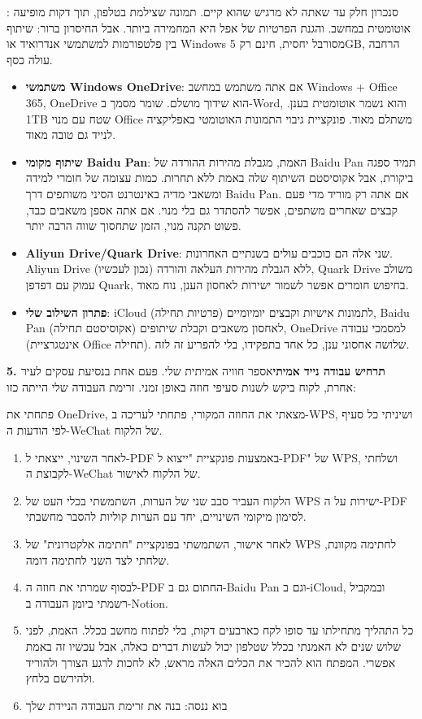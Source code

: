 
: סנכרון חלק עד שאתה לא מרגיש שהוא קיים. תמונה שצילמת בטלפון, תוך דקות מופיעה אוטומטית במחשב. והגנת הפרטיות של אפל היא המחמירה ביותר. אבל החיסרון ברור: שיתוף בין פלטפורמות למשתמשי אנדרואיד או Windows מסורבל יחסית, חינם רק 5GB, הרחבה עולה כסף.

\begin{itemize}
  \item \textbf{משתמשי Windows OneDrive}: אם אתה משתמש במחשב Windows + Office 365, OneDrive הוא שידוך מושלם. שומר מסמך ב-Word, והוא נשמר אוטומטית בענן. 1TB שטח עם מנוי Office משתלם מאוד. פונקציית גיבוי התמונות האוטומטי באפליקציה לנייד גם טובה מאוד.
  \item \textbf{שיתוף מקומי Baidu Pan}: האמת, מגבלת מהירות ההורדה של Baidu Pan תמיד ספגה ביקורת, אבל אקוסיסטם השיתוף שלה באמת ללא תחרות. כמות עצומה של חומרי למידה ומשאבי מדיה באינטרנט הסיני משותפים דרך Baidu Pan. אם אתה רק מוריד מדי פעם קבצים שאחרים משתפים, אפשר להסתדר גם בלי מנוי. אם אתה אספן משאבים כבד, פשוט תקנה מנוי, הזמן שתחסוך שווה הרבה יותר.
  \item \textbf{Aliyun Drive/Quark Drive}: שני אלה הם כוכבים עולים בשנתיים האחרונות. Aliyun Drive ללא הגבלת מהירות העלאה והורדה (נכון לעכשיו), Quark Drive משולב עמוק עם דפדפן Quark, בחיפוש חומרים אפשר לשמור ישירות לאחסון הענן, נוח מאוד.
  \item \textbf{פתרון השילוב שלי}: iCloud לתמונות אישיות וקבצים יומיומיים (פרטיות תחילה), Baidu Pan לאחסון משאבים וקבלת שיתופים (אקוסיסטם תחילה), OneDrive למסמכי עבודה (אינטגרציית Office תחילה). שלושה אחסוני ענן, כל אחד בתפקידו, בלי להפריע זה לזה.
\end{itemize}

\textbf{5. תרחיש עבודה נייד אמיתי}אספר חוויה אמיתית שלי. פעם אחת בנסיעת עסקים לעיר אחרת, לקוח ביקש לשנות סעיפי חוזה באופן זמני. זרימת העבודה שלי הייתה כזו:


פתחתי את OneDrive, מצאתי את החוזה המקורי, פתחתי לעריכה ב-WPS, ושיניתי כל סעיף לפי הודעות ה-WeChat של הלקוח.

\begin{enumerate}
  \item לאחר השינוי, ייצאתי ל-PDF באמצעות פונקציית "ייצוא ל-PDF" של WPS, ושלחתי לקבוצת ה-WeChat של הלקוח לאישור.
  \item הלקוח העביר סבב שני של הערות, השתמשתי בכלי העט של WPS ישירות על ה-PDF לסימון מיקומי השינויים, יחד עם הערות קוליות להסבר מחשבתי.
  \item לאחר אישור, השתמשתי בפונקציית "חתימה אלקטרונית" של WPS לחתימה מקוונת, שלחתי לצד השני לחתימה דומה.
  \item לבסוף שמרתי את חוזה ה-PDF החתום גם ב-Baidu Pan וגם ב-iCloud, ובמקביל רשמתי ביומן העבודה ב-Notion.
  \item כל התהליך מתחילתו עד סופו לקח כארבעים דקות, בלי לפתוח מחשב בכלל. האמת, לפני שלוש שנים לא האמנתי בכלל שטלפון יכול לעשות דברים כאלה, אבל עכשיו זה באמת אפשרי. המפתח הוא להכיר את הכלים האלה מראש, לא לחכות לרגע הצורך ולהוריד ולהירשם בלחץ.
  \item בוא ננסה: בנה את זרימת העבודה הניידת שלך
\end{enumerate}

